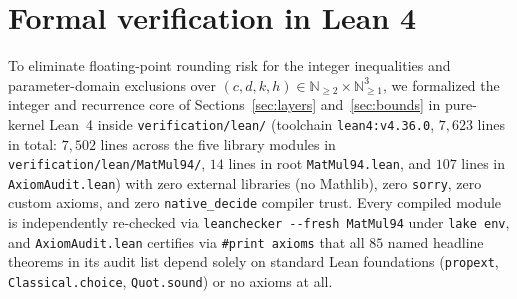 \documentclass[11pt,a4paper]{article}
\theoremstyle{plain}
\theoremstyle{definition}
\theoremstyle{remark}
\newcommand{\N}{\mathbb{N}}
\begin{document}
\section{Formal verification in Lean 4}
\label{sec:lean}

To eliminate floating-point rounding risk for the integer inequalities and parameter-domain exclusions over $(c, d, k, h) \in \N_{\ge 2} \times \N_{\ge 1}^3$, we formalized the integer and recurrence core of Sections~\ref{sec:layers} and~\ref{sec:bounds} in pure-kernel Lean~4 inside \texttt{verification/lean/} (toolchain \texttt{lean4:v4.36.0}, $7{,}623$ lines in total: $7{,}502$ lines across the five library modules in \texttt{verification/lean/MatMul94/}, $14$ lines in root \texttt{MatMul94.lean}, and $107$ lines in \texttt{AxiomAudit.lean}) with zero external libraries (no Mathlib), zero \texttt{sorry}, zero custom axioms, and zero \texttt{native\_decide} compiler trust. Every compiled module is independently re-checked via \texttt{leanchecker {-}{-}fresh MatMul94} under \texttt{lake env}, and \texttt{AxiomAudit.lean} certifies via \texttt{\#print axioms} that all $85$ named headline theorems in its audit list depend solely on standard Lean foundations (\texttt{propext}, \texttt{Classical.choice}, \texttt{Quot.sound}) or no axioms at all.
\end{document}
